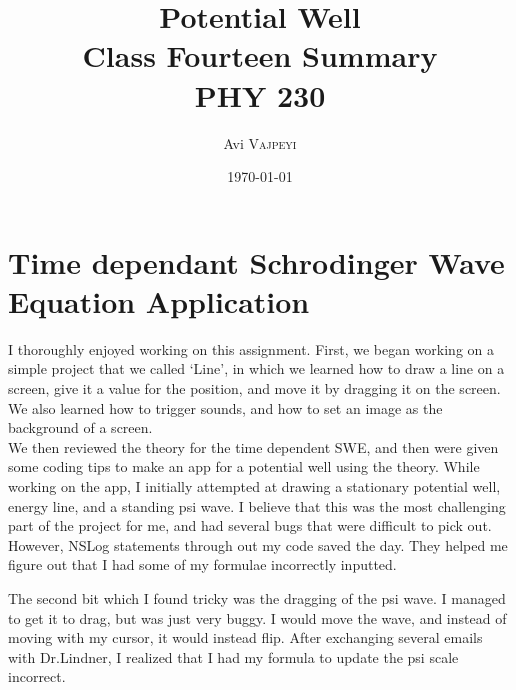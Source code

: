 \documentclass{article}
\title{Potential Well\\ Class Fourteen Summary\\ PHY 230} %
\author{Avi \textsc{Vajpeyi}} %
\date{\today} %
\begin{document}
\maketitle %





\section{Time dependant Schrodinger Wave Equation Application}

I thoroughly enjoyed working on this assignment. First, we began working on a simple project that we called `Line', in which we learned how to draw a line on a screen, give it a value for the position, and move it by dragging it on the screen. We also learned how to trigger sounds, and how to set an image as the background of a screen.\\ 

We then reviewed the theory for the time dependent SWE, and then were given some coding tips to make an app for a potential well using the theory. While working on the app, I initially attempted at drawing a stationary potential well, energy line, and a standing psi wave. I believe that this was the most challenging part of the project for me, and had several bugs that were difficult to pick out. However, NSLog statements through out my code saved the day. They helped me figure out that I had some of my formulae incorrectly inputted.

The second bit which I found tricky was the dragging of the psi wave. I managed to get it to drag, but was just very buggy. I would move the wave, and instead of moving with my cursor, it would instead flip. After exchanging several emails with Dr.Lindner, I realized that I had my formula to update the psi scale incorrect. 
 
\end{document}
